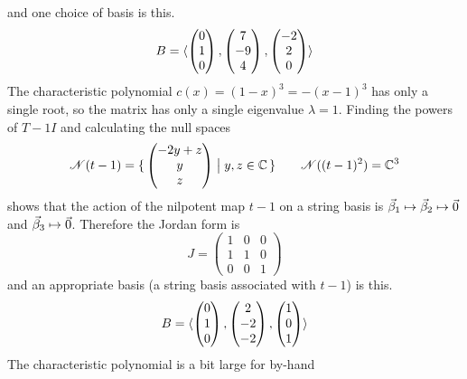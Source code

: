 \begin{exercises}
\begin{answer}
\begin{exparts}
            and one choice of basis is this.
            \begin{equation*}
              B=\langle\begin{pmatrix} 0 \\ 1 \\ 0 \end{pmatrix},
                          \begin{pmatrix} 7 \\ -9 \\ 4 \end{pmatrix},
                          \begin{pmatrix} -2 \\ 2 \\ 0 \end{pmatrix}\rangle
            \end{equation*}
        \partsitem The characteristic polynomial
            \( c(x)=(1-x)^3=-(x-1)^3 \) has only a single root,
            so the matrix has only a single eigenvalue $\lambda=1$.
            Finding the powers of $T-1I$ 
            and calculating the null spaces
            \begin{equation*}
               \mathscr{N}(t-1)=\mbox{$\{\,\begin{pmatrix} -2y+z \\ y \\ z \end{pmatrix}
                                      \bigm| y,z\in\mathbb{C}\,\}$} 
               \qquad
               \mathscr{N}((t-1)^2)=\mathbb{C}^3 
            \end{equation*}
            shows that the action of the nilpotent map $t-1$ on a string
            basis is
            $\vec{\beta}_1\mapsto\vec{\beta}_2\mapsto\vec{0}$ and
            $\vec{\beta}_3\mapsto\vec{0}$.
            Therefore the Jordan form is
            \begin{equation*}
                  J=
                  \begin{pmatrix}
                    1  &0  &0  \\
                    1  &1  &0  \\
                    0  &0  &1
                  \end{pmatrix}
            \end{equation*}
            and an appropriate basis (a string basis associated with
            $t-1$) is this.
            \begin{equation*}
              B=\langle\begin{pmatrix} 0 \\ 1 \\ 0 \end{pmatrix},
                          \begin{pmatrix} 2 \\ -2 \\ -2 \end{pmatrix},
                          \begin{pmatrix} 1 \\ 0 \\ 1 \end{pmatrix}\rangle
            \end{equation*}
        \partsitem The characteristic polynomial is a bit large for by-hand

\end{exparts}
\end{answer}
\end{exercises}

